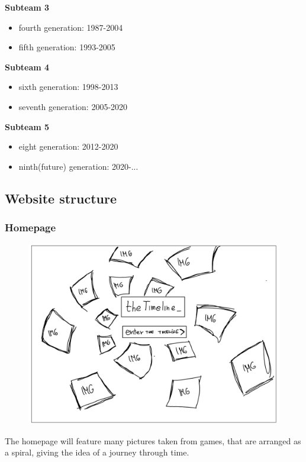 \documentclass[a4paper,10pt]{article}
\begin{document}
     \textbf{Subteam 3}
     \vspace{-0.3cm}
     \begin{itemize}
     \item fourth generation: 1987-2004
     \vspace{-0.3cm}
     \item fifth generation: 1993-2005
     \end{itemize}
     
     \textbf{Subteam 4}
     \vspace{-0.3cm}
     \begin{itemize}
     \item sixth generation: 1998-2013
     \vspace{-0.3cm}
     \item seventh generation: 2005-2020
     \end{itemize}
     
     \textbf{Subteam 5}
     \vspace{-0.3cm}
     \begin{itemize}
     \item eight generation: 2012-2020
     \vspace{-0.3cm}
     \item ninth(future) generation: 2020-...
     \vspace{-0.3cm}
     \end{itemize}
    
    \subsection{Website structure}
    \subsubsection{Homepage}        
        \begin{figure}[h]
        \includegraphics[width=.5\linewidth]{media/homepage_sketch.jpg}
        \end{figure}
        The homepage will feature many pictures taken from games, that are arranged as a spiral, giving the idea of a journey through time.
        \newline
    \newpage
\end{document}

